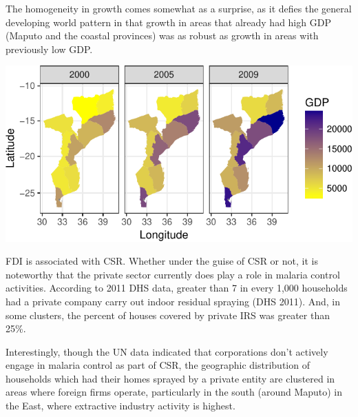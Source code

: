 \documentclass[]{article}
\begin{document}
The homogeneity in growth comes somewhat as a surprise, as it defies the
general developing world pattern in that growth in areas that already
had high GDP (Maputo and the coastal provinces) was as robust as growth
in areas with previously low GDP.

\begin{center}\includegraphics{figures/unnamed-chunk-14-1} \end{center}

FDI is associated with CSR. Whether under the guise of CSR or not, it is
noteworthy that the private sector currently does play a role in malaria
control activities. According to 2011 DHS data, greater than 7 in every
1,000 households had a private company carry out indoor residual
spraying (DHS 2011). And, in some clusters, the percent of houses
covered by private IRS was greater than 25\%.

Interestingly, though the UN data indicated that corporations don't
actively engage in malaria control as part of CSR, the geographic
distribution of households which had their homes sprayed by a private
entity are clustered in areas where foreign firms operate, particularly
in the south (around Maputo) in the East, where extractive industry
activity is highest.
\end{document}
